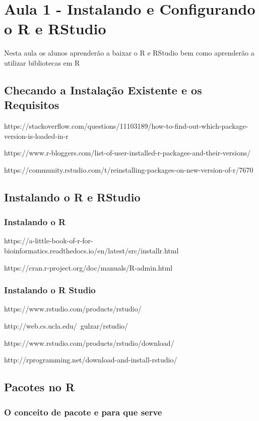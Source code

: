 \chapter{Aula 1 - Instalando e Configurando o R e RStudio}

Nesta aula os alunos aprenderão a baixar o R e RStudio bem como aprenderão a utilizar bibliotecas em R

\section{Checando a Instalação Existente e os Requisitos}

https://stackoverflow.com/questions/11103189/how-to-find-out-which-package-version-is-loaded-in-r

https://www.r-bloggers.com/list-of-user-installed-r-packages-and-their-versions/

https://community.rstudio.com/t/reinstalling-packages-on-new-version-of-r/7670

\section{Instalando o R e RStudio}

\subsection{Instalando o R}

https://a-little-book-of-r-for-bioinformatics.readthedocs.io/en/latest/src/installr.html


https://cran.r-project.org/doc/manuals/R-admin.html


\subsection{Instalando o R Studio}

https://www.rstudio.com/products/rstudio/

http://web.cs.ucla.edu/~gulzar/rstudio/

https://www.rstudio.com/products/rstudio/download/

http://rprogramming.net/download-and-install-rstudio/

\section{Pacotes no R}

\subsection{O conceito de pacote e para que serve}

